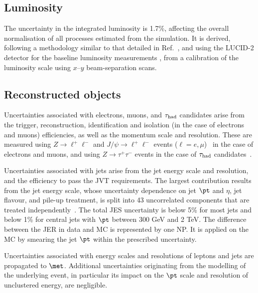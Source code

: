 \documentclass[PAPER, coverpage, atlasdraft=true, texlive=2016, UKenglish]{\ATLASLATEXPATH atlasdoc}
\begin{document}
\subsection{Luminosity}
\label{sec:syst_lumi}

The uncertainty in the integrated luminosity is 1.7\%, affecting the overall normalisation of all processes estimated from the simulation. 
It is derived, following a methodology similar to that detailed in Ref.~\cite{Aaboud:2016hhf}, and using the LUCID-2 detector 
for the baseline luminosity measurements \cite{Avoni:2018iuv}, from a calibration of the luminosity scale using $x$--$y$ beam-separation scans.

\subsection{Reconstructed objects}
\label{sec:syst_objects}

Uncertainties associated with electrons, muons, and $\tau_{\mathrm{had}}$ candidates arise from the trigger, reconstruction,  
identification and isolation (in the case of electrons and muons) efficiencies, as well as the momentum scale and resolution. 
These are measured using $Z\to \ell^+\ell^-$ and $J/\psi\to \ell^+\ell^-$ events ($\ell =e, \mu$)~\cite{ATLAS-CONF-2016-024,Aad:2016jkr} 
in the case of electrons and muons, and using $Z\to \tau^+\tau^-$ events in the case of $\tau_{\mathrm{had}}$ candidates~\cite{ATLAS-CONF-2017-029}.

Uncertainties associated with jets arise from the jet energy scale
and resolution, and the efficiency to pass the JVT requirements. 
The largest contribution results from the jet energy scale, whose uncertainty dependence on jet $\pt$ and $\eta$, jet flavour, and pile-up treatment, 
is split into 43 uncorrelated components that are treated independently~\cite{Aaboud:2017jcu}. The total JES uncertainty is
below 5\% for most jets and below 1\% for central jets with $\pt$ between 300 GeV and 2 TeV. The difference between the JER
in data and MC is represented by one NP. It is applied on the MC by smearing the jet $\pt$ within the prescribed uncertainty.

Uncertainties associated with energy scales and resolutions of leptons and jets 
are propagated to $\met$. Additional uncertainties originating from the modelling 
of the underlying event, in particular its impact on the $\pt$ scale and resolution 
of unclustered energy, are negligible.
\end{document}

